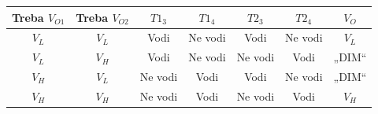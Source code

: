 \begingroup\fontsize{9}{10}\selectfont\renewcommand{\arraystretch}{.9}\begin{tabular}{ccccccc}\toprule
Treba $V_{O1}$&Treba $V_{O2}$&$T1_3$&$T1_4$&$T2_3$&$T2_4$&$V_O$\\\midrule
$V_L$&$V_L$&Vodi&Ne vodi&Vodi&Ne vodi&$V_L$\\
$V_L$&$V_H$&Vodi&Ne vodi&Ne vodi&Vodi&\textcolor{DEcrvena}{„DIM“}\\
$V_H$&$V_L$&Ne vodi&Vodi&Vodi&Ne vodi&\textcolor{DEcrvena}{„DIM“}\\
$V_H$&$V_H$&Ne vodi&Vodi&Ne vodi&Vodi&$V_H$\\\bottomrule
\end{tabular}\endgroup
